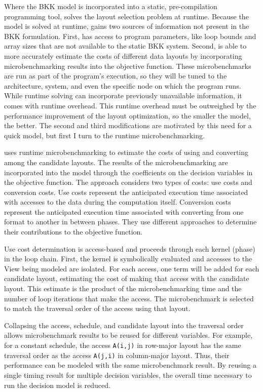 Where the BKK model is incorporated into a static, pre-compilation programming tool, \FormatDecisions{} solves the layout selection problem at runtime.
Because the model is solved at runtime, \FormatDecisions{} gains two sources of information not present in the BKK formulation.
First, \FormatDecisions{} has access to program parameters, like loop bounds and array sizes that are not available to the static BKK system.
Second, \FormatDecisions{} is able to more accurately estimate the costs of different data layouts by incorporating microbenchmarking results into the objective function.
These microbenchmarks are run as part of the program's execution, so they will be tuned to the architecture, system, and even the specific node on which the program runs.
While runtime solving can incorporate previously unavailable information, it comes with runtime overhead.
This runtime overhead must be outweighed by the performance improvement of the layout optimization, so the smaller the model, the better.
The second and third modifications are motivated by this need for a quick model, but first I turn to the runtime microbenchmarking.


\FormatDecisions{} uses runtime microbenchmarking to estimate the costs of using and converting among the candidate layouts. 
The results of the microbenchmarking are incorporated into the model through the coefficients on the decision variables in the objective function.
The approach considers two types of costs: use costs and conversion costs.
Use costs represent the anticipated execution time associated with accesses to the data during the computation itself.
Conversion costs represent the anticipated execution time associated with converting from one format to another in between phases.
They use different approaches to determine their contributions to the objective function.

Use cost determination is access-based and proceeds through each kernel (phase) in the loop chain.
First, the kernel is symbolically evaluated and accesses to the View being modeled are isolated.
For each access, one term will be added for each candidate layout, estimating the cost of making that access with the candidate layout.
This estimate is the product of the microbenchmarking time and the number of loop iterations that make the access.
The microbenchmark is selected to match the traversal order of the access using that layout.

Collapsing the access, schedule, and candidate layout into the traversal order allows microbenchmark results to be reused for different variables. 
For example, for a constant schedule, the access \verb.A(i,j). in row-major layout has the same traversal order as the access \verb.A(j,i). in column-major layout.
Thus, their performance can be modeled with the same microbenchmark result. 
By reusing a single timing result for multiple decision variables, the overall time necessary to run the decision model is reduced.

